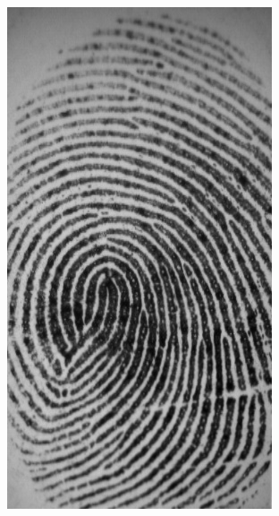 \documentclass{beamer}
\begin{document}
{\begin{figure}[!ht]
\begin{subfigure}[ht]{0.15\textwidth}
            \includegraphics[width=\textwidth]{fingerprints/2002Db2a/1_2_src.jpg}
        \end{subfigure}
        \qquad
        \begin{subfigure}[ht]{0.15\textwidth}

\end{subfigure}
\end{figure}}
\end{document}
